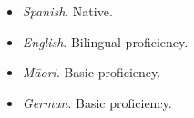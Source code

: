 \begin{itemize}
    \item \textit{Spanish}. Native.
    \item \textit{English}. Bilingual proficiency.
    \item \textit{Māori}. Basic proficiency.
    \item \textit{German}. Basic proficiency.
\end{itemize}
